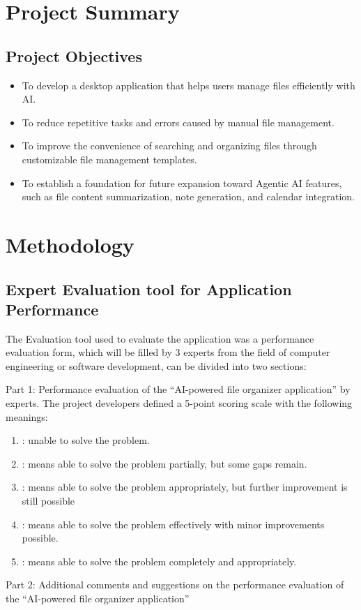 \documentclass[12pt,oneside,openright,a4paper]{cpe-english-project}
\begin{document}
\section{Project Summary}
\subsection*{Project Objectives}
\begin{itemize}
\item To develop a desktop application that helps users manage files efficiently with AI.
\item To reduce repetitive tasks and errors caused by manual file management.
\item To improve the convenience of searching and organizing files through customizable file management templates.
\item To establish a foundation for future expansion toward Agentic AI features, such as file content summarization, note generation, and calendar integration.
\end{itemize}
\section{Methodology}
\subsection*{Expert Evaluation tool for Application Performance}

The Evaluation tool used to evaluate the application was a performance evaluation form, which will be filled by 3 experts from the field of computer engineering or software development, can be divided into two sections:

\vspace{0.5em}

Part 1: Performance evaluation of the ``AI-powered file organizer application'' by experts. The project developers defined a 5-point scoring scale with the following meanings:

\begin{enumerate}[label=\arabic*.,leftmargin=0.6in]
\item : unable to solve the problem.
\item : means able to solve the problem partially, but some gaps remain.
\item : means able to solve the problem appropriately, but further improvement is still possible
\item : means able to solve the problem effectively with minor improvements possible.
\item : means able to solve the problem completely and appropriately.
\end{enumerate}
Part 2: Additional comments and suggestions on the performance evaluation of the ``AI-powered file organizer application''
\end{document}

